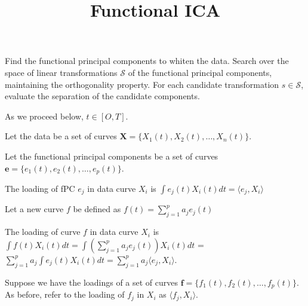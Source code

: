 \documentclass{article}
\title{Functional ICA}
\begin{document}
  
  \maketitle
  
  Find the functional principal components to whiten the data.
  Search over the space of linear transformations $\mathcal{S}$ of the functional principal components, maintaining the orthogonality property.
  For each candidate transformation $s \in \mathcal{S}$, evaluate the separation of the candidate components.

As we proceed below, $t \in [O, T]$.

Let the data be a set of curves $\mathbf{X} = \{X_1(t), X_2(t), \ldots, X_n(t)\}$.

Let the functional principal components be a set of curves $\mathbf{e} = \{e_1(t), e_2(t), \ldots, e_p(t)\}$.

The loading of fPC $e_j$ in data curve $X_i$ is $\int e_j(t) X_i(t) dt = \langle e_j, X_i \rangle$

Let a new curve $f$ be defined as $f(t) = \sum_{j=1}^p a_j e_j(t)$

The loading of curve $f$ in data curve $X_i$ is $\int f(t) X_i(t) dt = \int (\sum_{j=1}^p a_j e_j(t)) X_i(t) dt$ = $\sum_{j=1}^p a_j \int e_j(t) X_i(t) dt = \sum_{j=1}^p a_j \langle e_j, X_i \rangle$.

Suppose we have the loadings of a set of curves $\mathbf{f} = \{f_1(t), f_2(t), \ldots, f_p(t)\}$. As before, refer to the loading of $f_j$ in $X_i$ as $\langle f_j, X_i \rangle$.
  
  
  
\end{document}
